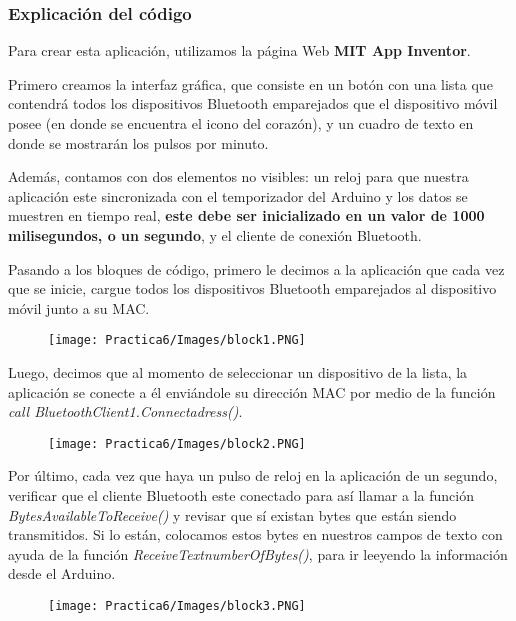 \documentclass[12pt]{article}
\begin{document}
    \subsubsection{Explicación del código}
    Para crear esta aplicación, utilizamos la página Web \textbf{MIT App Inventor}. 
    
    Primero creamos la interfaz gráfica, que consiste en un botón con una lista que contendrá todos los dispositivos Bluetooth emparejados que el dispositivo móvil posee (en donde se encuentra el icono del corazón), y un cuadro de texto en donde se mostrarán los pulsos por minuto.
    
    Además, contamos con dos elementos no visibles: un reloj para que nuestra aplicación este sincronizada con el temporizador del Arduino y los datos se muestren en tiempo real, \textbf{este debe ser inicializado en un valor de 1000 milisegundos, o un segundo}, y el cliente de conexión Bluetooth.
    
    Pasando a los bloques de código, primero le decimos a la aplicación que cada vez que se inicie, cargue todos los dispositivos Bluetooth emparejados al dispositivo móvil junto a su MAC.
    \begin{figure}[h!]
                \centering
             \texttt{[image: Practica6/Images/block1.PNG]}
    \end{figure}
    
    Luego, decimos que al momento de seleccionar un dispositivo de la lista, la aplicación se conecte a él enviándole su dirección MAC por medio de la función\\
    \textit{call BluetoothClient1.Connectadress()}.
    
    \begin{figure}[h!]
                \centering
             \texttt{[image: Practica6/Images/block2.PNG]}
    \end{figure}
    
    Por último, cada vez que haya un pulso de reloj en la aplicación de un segundo, verificar que el cliente Bluetooth este conectado para así llamar a la función \textit{BytesAvailableToReceive()} y revisar que sí existan bytes que están siendo transmitidos. Si lo están, colocamos estos bytes en nuestros campos de texto con ayuda de la función \textit{ReceiveTextnumberOfBytes()}, para ir leeyendo la información desde el Arduino.
    
    \begin{figure}[h!]
                \centering
             \texttt{[image: Practica6/Images/block3.PNG]}
    \end{figure}
    
\end{document}
